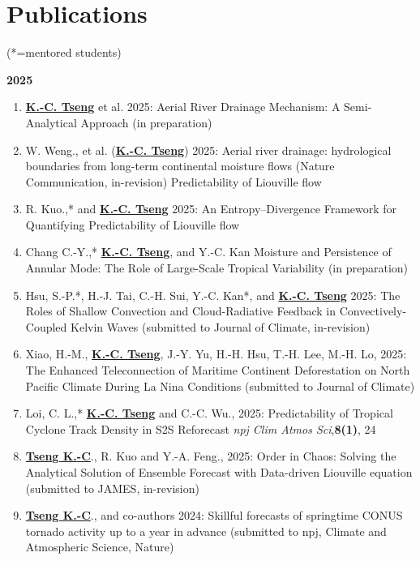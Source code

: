 \documentclass{article}
\begin{document}
\section{\color{airforceblue}Publications} (*=mentored students)\par
\normalsize{\bf{2025}} 
\begin{enumerate} 
	\item \normalsize{\bf{\underline{K.-C. Tseng}}} et al. 2025: Aerial River Drainage Mechanism: A
Semi-Analytical Approach (in preparation)
	\item W. Weng., et al. (\normalsize{\bf{\underline{K.-C. Tseng}}}) 2025: Aerial river drainage: hydrological boundaries from long-term continental moisture flows (Nature Communication, in-revision)
Predictability of Liouville flow
	\item R. Kuo.,* and \normalsize{\bf{\underline{K.-C. Tseng}}} 2025: An Entropy–Divergence Framework for Quantifying
Predictability of Liouville flow
	\item Chang C.-Y.,* \normalsize{\bf{\underline{K.-C. Tseng}}}, and Y.-C. Kan Moisture and Persistence of Annular Mode: The Role of Large-Scale Tropical Variability (in preparation) 
	\item Hsu, S.-P.*, H.-J. Tai, C.-H. Sui, Y.-C. Kan*, and \normalsize{\bf{\underline{K.-C. Tseng}}} 2025: The Roles of Shallow Convection and Cloud-Radiative Feedback in Convectively-Coupled Kelvin Waves (submitted to Journal of Climate, in-revision)
	\item Xiao, H.-M., \normalsize{\bf{\underline{K.-C. Tseng}}}, J.-Y. Yu, H.-H. Hsu, T.-H. Lee, M.-H. Lo, 2025: The Enhanced Teleconnection of Maritime Continent Deforestation on North Pacific Climate During La Nina Conditions (submitted to Journal of Climate)
	\item Loi, C. L.,* \normalsize{\bf{\underline{K.-C. Tseng}}} and C.-C. Wu., 2025: Predictability of Tropical Cyclone Track Density in S2S Reforecast  \textit{npj Clim Atmos Sci},\normalsize{\bf{8(1)}}, 24
	\item \normalsize{\bf{\underline{Tseng K.-C}}}., R. Kuo and Y.-A. Feng., 2025: Order in Chaos: Solving the Analytical Solution of Ensemble Forecast with Data-driven Liouville equation (submitted to JAMES, in-revision)
	\item \normalsize{\bf{\underline{Tseng K.-C}}}., and co-authors 2024: Skillful forecasts of springtime CONUS tornado activity up to a year in advance (submitted to npj, Climate and Atmospheric Science, Nature) 

\end{enumerate}	
\end{document}
